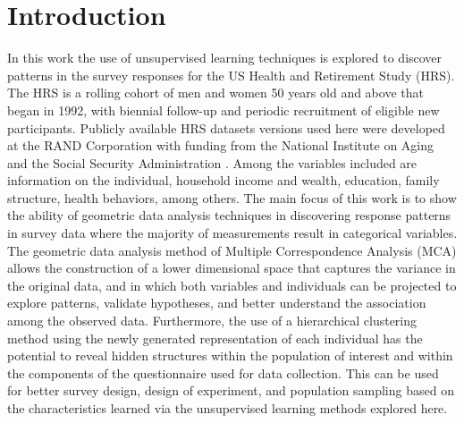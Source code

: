 \documentclass[conference]{IEEEtran}
\begin{document}
\maketitle


%
\IEEEpeerreviewmaketitle


\hypertarget{introduction}{%
\section{Introduction}\label{introduction}}

In this work the use of unsupervised learning techniques is explored to
discover patterns in the survey responses for the US Health and
Retirement Study (HRS). The HRS is a rolling cohort of men and women 50
years old and above that began in 1992, with biennial follow-up and
periodic recruitment of eligible new participants. Publicly available
HRS datasets versions used here were developed at the RAND Corporation
with funding from the National Institute on Aging and the Social
Security Administration \cite{rand2008data}. Among the variables
included are information on the individual, household income and wealth,
education, family structure, health behaviors, among others. The main
focus of this work is to show the ability of geometric data analysis
techniques in discovering response patterns in survey data where the
majority of measurements result in categorical variables. The geometric
data analysis method of Multiple Correspondence Analysis (MCA) allows
the construction of a lower dimensional space that captures the variance
in the original data, and in which both variables and individuals can be
projected to explore patterns, validate hypotheses, and better
understand the association among the observed data. Furthermore, the use
of a hierarchical clustering method using the newly generated
representation of each individual has the potential to reveal hidden
structures within the population of interest and within the components
of the questionnaire used for data collection. This can be used for
better survey design, design of experiment, and population sampling
based on the characteristics learned via the unsupervised learning
methods explored here.
\end{document}
